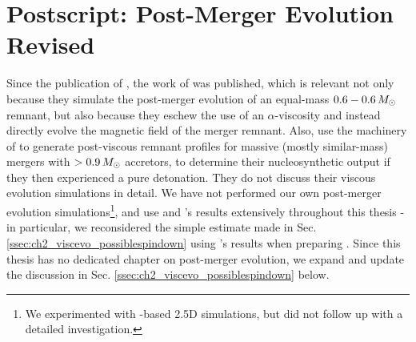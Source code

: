 \section{Postscript: Post-Merger Evolution Revised}
\label{sec:c2_postscript}

Since the publication of \citeal{zhu+13}, the work of \cite{ji+13} was published, which is relevant not only because they simulate the post-merger evolution of an equal-mass $0.6-0.6\,\Msun$ remnant, but also because they eschew the use of an $\alpha$-viscosity and instead directly evolve the magnetic field of the merger remnant.  Also, \cite{rask+14} use the machinery of \cite{schw+12} to generate post-viscous remnant profiles for massive (mostly similar-mass) mergers with $>0.9\,\Msun$ accretors, to determine their nucleosynthetic output if they then experienced a pure detonation.  They do not discuss their viscous evolution simulations in detail.  We have not performed our own post-merger evolution simulations\footnote{We experimented with \flash-based 2.5D simulations, but did not follow up with a detailed investigation.}, and use \cite{schw+12} and \cite{ji+13}'s results extensively throughout this thesis - in particular, we reconsidered the simple estimate made in Sec. \ref{ssec:ch2_viscevo_possiblespindown} using \cite{ji+13}'s results when preparing \citeal{zhu+16}.  Since this thesis has no dedicated chapter on post-merger evolution, we expand and update the discussion in Sec. \ref{ssec:ch2_viscevo_possiblespindown} below.


